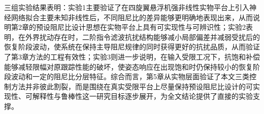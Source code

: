 三组实验结果表明：实验1主要验证了在四旋翼悬浮机强非线性实物平台上引入神经网络拟合主要未知非线性后，不同阻尼比的差异能够更明确地表现出来，从而说明第2章的预设阻尼比设计思想在实物平台上具有可实现性与可辨识性；实验2表明，在外界扰动存在时，二阶指令滤波抗扰结构能够减小局部偏差并减弱受扰后的恢复阶段波动，使系统在保持主导阻尼规律的同时获得更好的抗扰品质，从而验证了第3章方法的工程有效性；实验3则进一步说明，在输入受限工况下，抗饱和补偿能够减轻限幅对原跟踪性能的破坏，使姿态响应在出现饱和时仍保持较小的恢复阶段波动和一定的阻尼比分层特征。综合而言，第5章从实物层面验证了本文三类控制方法并非彼此割裂，而是围绕在真实受限平台上尽量保持预设阻尼比设计的可实现性、可解释性与鲁棒性这一研究目标逐步展开，为全文结论提供了直接的实验支撑。


